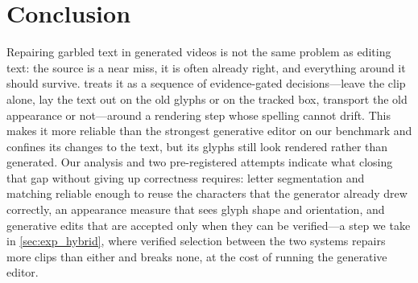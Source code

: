 \section{Conclusion}
\label{sec:conclusion}
Repairing garbled text in generated videos is not the same problem as editing text: the source is a near miss, it is often already right, and everything around it should survive. \method treats it as a sequence of evidence-gated decisions---leave the clip alone, lay the text out on the old glyphs or on the tracked box, transport the old appearance or not---around a rendering step whose spelling cannot drift. This makes it more reliable than the strongest generative editor on our benchmark and confines its changes to the text, but its glyphs still look rendered rather than generated. Our analysis and two pre-registered attempts indicate what closing that gap without giving up correctness requires: letter segmentation and matching reliable enough to reuse the characters that the generator already drew correctly, an appearance measure that sees glyph shape and orientation, and generative edits that are accepted only when they can be verified---a step we take in \cref{sec:exp_hybrid}, where verified selection between the two systems repairs more clips than either and breaks none, at the cost of running the generative editor.
